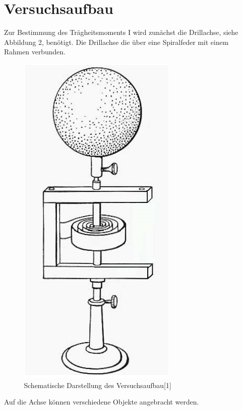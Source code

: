 \section{Versuchsaufbau}
Zur Bestimmung des Trägheitsmoments I wird zunächst die
Drillachse, siehe Abbildung 2, benötigt. Die Drillachse
die über eine Spiralfeder mit einem Rahmen verbunden.
\begin{figure}[H]
  \centering
  \includegraphics[width=5 cm , height= 10 cm]{Bild2.jpg}
   \caption{Schematische Darstellung des Versuchsaufbau[1]}
\end{figure}
Auf die Achse können verschiedene Objekte angebracht werden.
